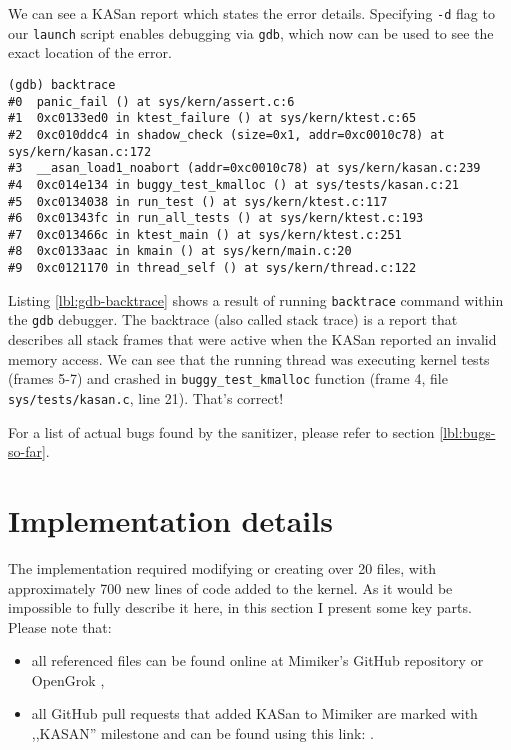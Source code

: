 \documentclass[shortabstract, manyadvisors, english, mgr]{iithesis}
\theoremstyle{definition} \newtheorem*{definition}{Definicja}
\theoremstyle{definition} \newtheorem*{example}{Przykład}
\theoremstyle{definition} \newtheorem*{remark}{Uwaga}
\begin{document}
We can see a KASan report which states the error details. Specifying \texttt{-d} flag to our \texttt{launch} script enables debugging via \texttt{gdb}, which now can be used to see the exact location of the error.
\begin{lstlisting}[caption={Example \texttt{gdb} backtrace (simplified) containing the error's location.}, label={lbl:gdb-backtrace}]
(gdb) backtrace
#0  panic_fail () at sys/kern/assert.c:6
#1  0xc0133ed0 in ktest_failure () at sys/kern/ktest.c:65
#2  0xc010ddc4 in shadow_check (size=0x1, addr=0xc0010c78) at sys/kern/kasan.c:172
#3  __asan_load1_noabort (addr=0xc0010c78) at sys/kern/kasan.c:239
#4  0xc014e134 in buggy_test_kmalloc () at sys/tests/kasan.c:21
#5  0xc0134038 in run_test () at sys/kern/ktest.c:117
#6  0xc01343fc in run_all_tests () at sys/kern/ktest.c:193
#7  0xc013466c in ktest_main () at sys/kern/ktest.c:251
#8  0xc0133aac in kmain () at sys/kern/main.c:20
#9  0xc0121170 in thread_self () at sys/kern/thread.c:122
\end{lstlisting}

Listing \ref{lbl:gdb-backtrace} shows a result of running \texttt{backtrace} command within the \texttt{gdb} debugger.
The backtrace (also called stack trace) is a report that describes all stack frames that were active when the KASan reported an invalid memory access.
We can see that the running thread was executing kernel tests (frames 5-7) and crashed in \texttt{buggy\_test\_kmalloc} function (frame 4, file \texttt{sys/tests/kasan.c}, line 21).
That's correct!

For a list of actual bugs found by the sanitizer, please refer to section \ref{lbl:bugs-so-far}.

\section{Implementation details}
The implementation required modifying or creating over 20 files, with approximately 700 new lines of code added to the kernel. As it would be impossible to fully describe it here, in this section I present some key parts. Please note that:
\begin{itemize}
    \item all referenced files can be found online at Mimiker's GitHub repository \cite{bib:mimiker-github} or OpenGrok \cite{bib:mimiker-opengrok},
    \item all GitHub pull requests that added KASan to Mimiker are marked with ,,KASAN'' milestone and can be found using this link: \cite{bib:mimiker-kasan-milestone}.
\end{itemize}
\end{document}
